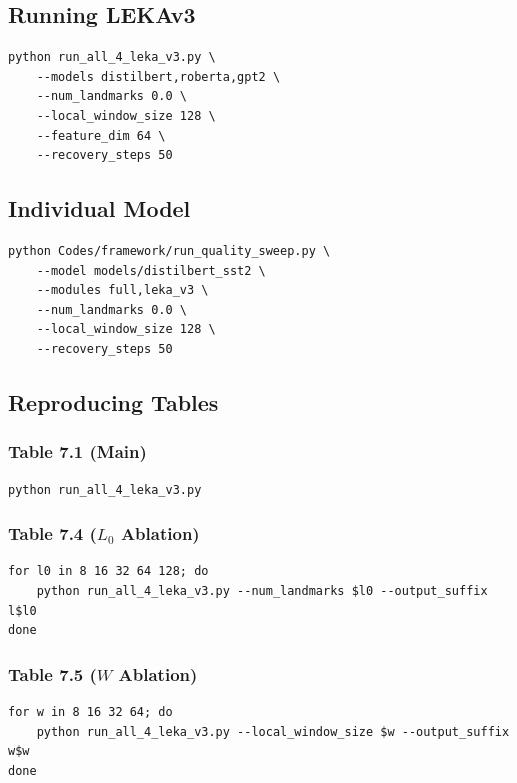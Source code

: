 \subsection{Running LEKAv3}

\begin{lstlisting}
python run_all_4_leka_v3.py \
    --models distilbert,roberta,gpt2 \
    --num_landmarks 0.0 \
    --local_window_size 128 \
    --feature_dim 64 \
    --recovery_steps 50
\end{lstlisting}

\subsection{Individual Model}

\begin{lstlisting}
python Codes/framework/run_quality_sweep.py \
    --model models/distilbert_sst2 \
    --modules full,leka_v3 \
    --num_landmarks 0.0 \
    --local_window_size 128 \
    --recovery_steps 50
\end{lstlisting}

\subsection{Reproducing Tables}

\subsubsection{Table 7.1 (Main)}
\begin{lstlisting}
python run_all_4_leka_v3.py
\end{lstlisting}

\subsubsection{Table 7.4 ($L_0$ Ablation)}
\begin{lstlisting}
for l0 in 8 16 32 64 128; do
    python run_all_4_leka_v3.py --num_landmarks $l0 --output_suffix l$l0
done
\end{lstlisting}

\subsubsection{Table 7.5 ($W$ Ablation)}
\begin{lstlisting}
for w in 8 16 32 64; do
    python run_all_4_leka_v3.py --local_window_size $w --output_suffix w$w
done
\end{lstlisting}

